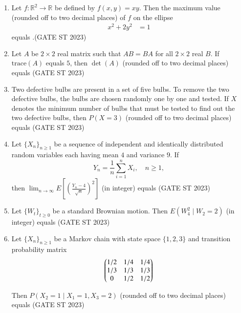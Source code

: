 \documentclass[journal]{IEEEtran}
\begin{document}
\begin{enumerate}[label=\textbf{Q.\arabic*.}, start=11, align=left, itemsep=2em]
\item Let $f: \mathbb{R}^2 \to \mathbb{R}$ be defined by $f(x, y) = xy$.  
Then the maximum value (rounded off to two decimal places) of $f$ on the ellipse  
\begin{align}
x^2 + 2y^2 &= 1
\end{align}
equals \underline{\hspace{2cm}}.\hfill(GATE ST 2023)


\item Let $A$ be $2\times 2$ real matrix such that $AB=BA$ for all $2\times2$ real $B$. If $\mathrm{trace}(A)$ equals $5$, then $\det(A)$ (rounded off to two decimal places) equals \underline{\hspace{3cm}}\hfill(GATE ST 2023)



\item Two defective bulbs are present in a set of five bulbs. To remove the two defective bulbs, the bulbs are chosen randomly one by one and tested. If $X$ denotes the minimum number of bulbs that must be tested to find out the two defective bulbs, then $P(X=3)$ (rounded off to two decimal places) equals \underline{\hspace{3cm}}\hfill(GATE ST 2023)

\item Let $\{X_n\}_{n\ge 1}$ be a sequence of independent and identically distributed random variables each having mean $4$ and variance $9$. If 
\[
Y_n = \frac{1}{n} \sum_{i=1}^n X_i, \quad n \ge 1,
\]
then $\lim_{n\to\infty} E\left[ \left( \frac{Y_n - 4}{\sqrt{n}} \right)^2 \right]$ (in integer) equals \underline{\hspace{3cm}}\hfill(GATE ST 2023)

\item Let $\{W_t\}_{t\ge 0}$ be a standard Brownian motion. Then $E(W_4^2 \mid W_2 = 2)$ (in integer) equals \underline{\hspace{3cm}}
\hfill(GATE ST 2023)

\item Let $\{X_n\}_{n\ge 1}$ be a Markov chain with state space $\{1,2,3\}$ and transition probability matrix
\[
\begin{pmatrix}
1/2 & 1/4 & 1/4 \\
1/3 & 1/3 & 1/3 \\
0 & 1/2 & 1/2
\end{pmatrix}
\]


Then $P(X_2 = 1 \mid X_1 = 1, X_3 = 2)$ (rounded off to two decimal places) equals \underline{\hspace{3cm}}\hfill(GATE ST 2023)


\end{enumerate}
\end{document}
